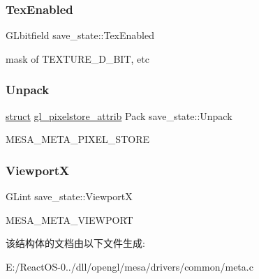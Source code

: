 \subsubsection{\texorpdfstring{Tex\+Enabled}{TexEnabled}}
{\footnotesize\ttfamily G\+Lbitfield save\+\_\+state\+::\+Tex\+Enabled}

mask of T\+E\+X\+T\+U\+R\+E\+\_\+D\+\_\+\+B\+IT, etc \mbox{\label{structsave__state_afda39d660e21a6085b681070f5e5cc0a}} 
\subsubsection{\texorpdfstring{Unpack}{Unpack}}
{\footnotesize\ttfamily \hyperlink{interfacestruct}{struct} \hyperlink{structgl__pixelstore__attrib}{gl\+\_\+pixelstore\+\_\+attrib} Pack save\+\_\+state\+::\+Unpack}

M\+E\+S\+A\+\_\+\+M\+E\+T\+A\+\_\+\+P\+I\+X\+E\+L\+\_\+\+S\+T\+O\+RE \mbox{\label{structsave__state_ab89fba78e7f4b9a14df72454e69f61d2}} 
\subsubsection{\texorpdfstring{ViewportX}{ViewportX}}
{\footnotesize\ttfamily G\+Lint save\+\_\+state\+::\+ViewportX}

M\+E\+S\+A\+\_\+\+M\+E\+T\+A\+\_\+\+V\+I\+E\+W\+P\+O\+RT 

该结构体的文档由以下文件生成\+:\begin{DoxyCompactItemize}
\item 
E\+:/\+React\+O\+S-\/0../dll/opengl/mesa/drivers/common/meta.\+c\end{DoxyCompactItemize}
